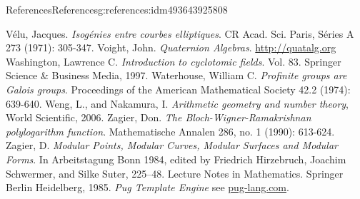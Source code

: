\documentclass[oneside,10pt,]{book}
\numberwithin{equation}{section}
\begin{document}
\begin{references-chapter-numberless}{References}{}{References}{}{}{g:references:idm493643925808}
\begin{thebibliography}{9}
\hypertarget{x:biblio:bib-velu}{}Vélu, Jacques. \textit{Isogénies entre courbes elliptiques}. CR Acad. Sci. Paris, Séries A 273 (1971): 305-347.
\hypertarget{x:biblio:bib-voight-quat}{}Voight, John. \textit{Quaternion Algebras}. \url{http://quatalg.org}
\hypertarget{x:biblio:bib-washington}{}Washington, Lawrence C. \textit{Introduction to cyclotomic fields}. Vol. 83. Springer Science \& Business Media, 1997.
\hypertarget{x:biblio:bib-waterhouse}{}Waterhouse, William C.  \textit{Profinite groups are Galois groups}. Proceedings of the American Mathematical Society 42.2 (1974): 639-640.
\hypertarget{x:biblio:bib-weng-nakamura}{}Weng, L., and Nakamura, I. \textit{Arithmetic geometry and number theory}, World Scientific, 2006.
\hypertarget{x:biblio:bib-zag-ram}{}Zagier, Don.  \textit{The Bloch-Wigner-Ramakrishnan polylogarithm function}. Mathematische Annalen 286, no. 1 (1990): 613-624.
\hypertarget{x:biblio:bib-zagier-modular}{}Zagier, D. \textit{Modular Points, Modular Curves, Modular Surfaces and Modular Forms}. In Arbeitstagung Bonn 1984, edited by Friedrich Hirzebruch, Joachim Schwermer, and Silke Suter, 225–48. Lecture Notes in Mathematics. Springer Berlin Heidelberg, 1985.
\hypertarget{x:biblio:bib-pug}{}\textit{Pug Template Engine} see \href{http://pug-lang.com/}{pug-lang.com}.
\end{thebibliography}
\end{references-chapter-numberless}
\end{document}
